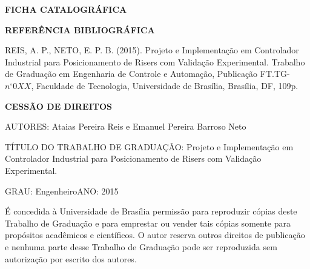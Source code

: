 \noindent \textbf{FICHA CATALOGRÁFICA}

\noindent %

\noindent \medskip{}


\noindent \textbf{REFERÊNCIA BIBLIOGRÁFICA}

REIS, A. P., NETO, E. P. B. (2015). Projeto e Implementação em Controlador Industrial para Posicionamento de Risers com Validação Experimental. Trabalho de Graduação em Engenharia de Controle e Automação, Publicação FT.TG-$n^{\circ}0XX$, Faculdade de Tecnologia, Universidade
de Brasília, Brasília, DF, 109p.

\noindent \bigskip{}


\noindent \textbf{CESSÃO DE DIREITOS}

\noindent AUTORES: Ataias Pereira Reis e Emanuel Pereira Barroso Neto

TÍTULO DO TRABALHO DE GRADUAÇÃO: Projeto e Implementação em Controlador Industrial para Posicionamento de Risers com Validação Experimental.
\noindent \medskip{}


\noindent GRAU: Engenheiro\hfill{}ANO: 2015\hfill{}

\noindent \medskip{}


É concedida à Universidade de Brasília permissão para reproduzir cópias
deste Trabalho de Graduação e para emprestar ou vender tais cópias
somente para propósitos acadêmicos e científicos. O autor reserva
outros direitos de publicação e nenhuma parte desse Trabalho de Graduação
pode ser reproduzida sem autorização por escrito dos autores.

